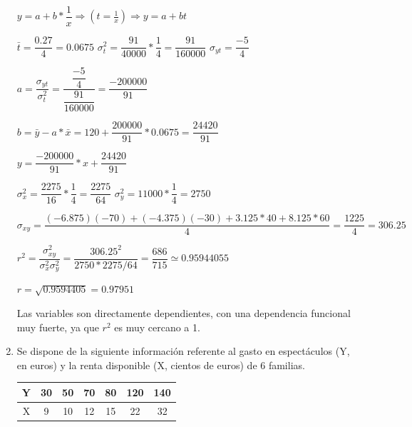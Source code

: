 \documentclass[10pt,a4paper]{article}
\begin{document}
\begin{enumerate}
\vspace{00.25cm}
$ y = a + b* \dfrac{1}{x} \Rightarrow (t = \frac{1}{x}) \Rightarrow y = a + bt$

\vspace{0.25cm}
$\bar{t} = \dfrac{0.27}{4} = 0.0675$ \hspace{2cm} $\sigma_t^2 = \dfrac{91}{40000} * \dfrac{1}{4} = \dfrac{91}{160000}$ \hspace{2cm} $\sigma_{yt} = \dfrac{-5}{4}$

\vspace{0.25cm}

$a = \dfrac{\sigma_{yt}}{\sigma_t^2} = \dfrac{\dfrac{-5}{4}}{\dfrac{91}{160000}} = \dfrac{-200000}{91}$

$b = \bar{y} - a*\bar{x} = 120 + \dfrac{200000}{91} * 0.0675 = \dfrac{24420}{91}$

\vspace{0.25cm}
$y = \dfrac{-200000}{91} * x + \dfrac{24420}{91}$

\vspace{0.25cm}
$\sigma_x^2 = \dfrac{2275}{16} * \dfrac{1}{4} = \dfrac{2275}{64}$ \hspace{2.5cm} $\sigma_y^2 = 11000 * \dfrac{1}{4} = 2750$

\vspace{0.25cm}
$\sigma_{xy} = \dfrac{(-6.875)(-70) + (-4.375)(-30) + 3.125*40 + 8.125*60}{4} = \dfrac{1225}{4} = 306.25$

\vspace{0.25cm}
$r^2 = \dfrac{\sigma_{xy}^2}{\sigma_{x}^2 \sigma_y^2} = \dfrac{306.25^2}{2750 * 2275/64} = \dfrac{686}{715} \simeq 0.95944055$

\vspace{0.25cm}
$r = \sqrt{0.9594405} = 0.97951$

\vspace{0.25cm}
Las variables son directamente dependientes, con una dependencia funcional muy fuerte, ya que $r^2$ es muy cercano a 1.

\newpage
\item Se dispone de la siguiente información referente al gasto en espectáculos (Y, en euros) y la renta disponible (X, cientos de euros) de 6 familias.

\vspace{.25cm}
\begin{tabular}{|c|c|c|c|c|c|c|}
\hline 
Y & 30 & 50 & 70 & 80 & 120 & 140 \\ 
\hline 
X & 9 & 10 & 12 & 15 & 22 & 32 \\ 
\hline 
\end{tabular} 


\end{enumerate}
\end{document}
